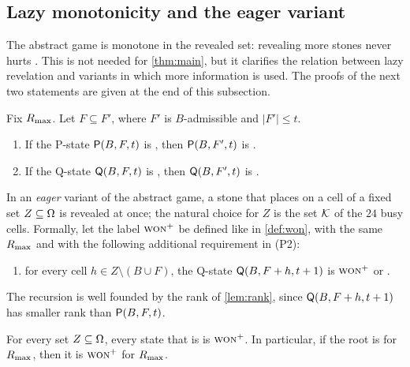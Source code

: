 
\subsection{Lazy monotonicity and the eager variant}\label{sec:extra-lazy}

The abstract game is monotone in the revealed set: revealing more stones never hurts \Breaker. This is not
needed for \cref{thm:main}, but it clarifies the relation between lazy revelation and variants in
which more information is used. The proofs of the next two statements are given at the end of this
subsection.

\begin{proposition}\label{prop:lazy-monotone}
Fix $R_{\max}$. Let $F\subseteq F'$, where $F'$ is $B$-admissible and $|F'|\le t$.
\begin{enumerate}[label=\textup{(\alph*)},leftmargin=2.4em]
\item If the P-state $\mathsf{P}(B,F,t)$ is \WON, then $\mathsf{P}(B,F',t)$ is \WON.
\item If the Q-state $\mathsf{Q}(B,F,t)$ is \WON, then $\mathsf{Q}(B,F',t)$ is \WON.
\end{enumerate}
\end{proposition}

In an \emph{eager} variant of the abstract game, a stone that \Maker{} places on a cell of a fixed set
$Z\subseteq\Omega$ is revealed at once; the natural choice for $Z$ is the set $\mathcal{K}$ of the $24$ busy cells. Formally, let the label $\textup{\textsc{won}}^{+}$ be defined like \WON{} in
\cref{def:won}, with the same $R_{\max}$ and with the following additional requirement in (P2):
\begin{enumerate}[leftmargin=2.6em]
\item[\textup{(b)}] for every cell $h\in Z\setminus(B\cup F)$, the Q-state $\mathsf{Q}(B,F+h,t+1)$ is $\textup{\textsc{won}}^{+}$ or
  \VOID.
\end{enumerate}
The recursion is well founded by the rank of \cref{lem:rank}, since $\mathsf{Q}(B,F+h,t+1)$ has smaller rank
than $\mathsf{P}(B,F,t)$.

\begin{corollary}\label{cor:eager}
For every set $Z\subseteq\Omega$, every state that is \WON{} is $\textup{\textsc{won}}^{+}$. In particular, if the root is \WON{} for
$R_{\max}$, then it is $\textup{\textsc{won}}^{+}$ for $R_{\max}$.
\end{corollary}

